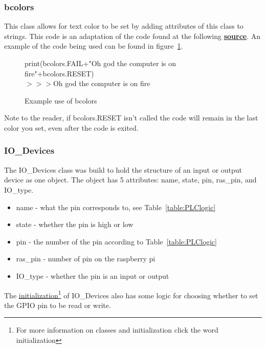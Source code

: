 \documentclass{article}
\begin{document}
\subsubsection{bcolors}
This class allows for text color to be set by adding attributes of this class to strings. This code is an adaptation of the code found at the following \textbf{\href{https://stackoverflow.com/questions/287871/how-to-print-colored-text-to-the-terminal}{source}}. An example of the code being used can be found in figure~\ref{fig:bcolors}.

\begin{center}
    \begin{figure}[h!]
        print(bcolors.FAIL+"Oh god the computer is on fire"+bcolors.RESET)\\
        $>$$>$$>${\color{red}Oh god the computer is on fire}
      \caption{Example use of bcolors}
      \label{fig:bcolors}
    \end{figure}
\end{center}

Note to the reader, if bcolors.RESET isn't called the code will remain in the last color you set, even after the code is exited.


\subsubsection{IO\_Devices}
The IO\_Devices class was build to hold the structure of an input or output device as one object. The object has 5 attributes: name, state, pin, ras\_pin, and  IO\_type.

\begin{itemize}
    \item name - what the pin corresponds to, see Table~\ref{table:PLClogic}
    \item state - whether the pin is high or low 
    \item pin - the number of the pin according to Table~\ref{table:PLClogic}
    \item ras\_pin - number of pin on the raspberry pi
    \item IO\_type - whether the pin is an input or output
\end{itemize}
The \href{https://www.w3schools.com/python/python_classes.asp}{initialization}\footnote{For more information on classes and initialization click the word initialization} of IO\_Devices also has some logic for choosing whether to set the GPIO pin to be read or write.\\
\end{document}
